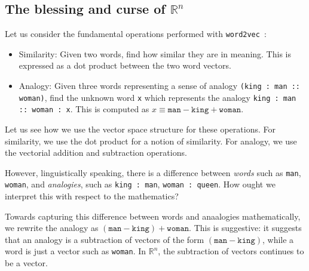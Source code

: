 \documentclass{book}
\newcommand{\wtov}{\texttt{word2vec }}
\begin{document}


\subsection{The blessing and curse of $\mathbb{R}^n$}

Let us consider the fundamental operations performed with \wtov:

\begin{itemize}
\item Similarity: Given two words, find how similar they are in meaning. This is
     expressed as a dot product between the two word vectors.
\item Analogy: Given three words representing a sense of analogy \texttt{(king : man :: woman)},
      find the unknown word \texttt{x} which represents the analogy
      \texttt{king : man :: woman : x}. This is computed as $x \equiv \texttt{man} - \texttt{king} + \texttt{woman}$.
\end{itemize}

Let us see how we use the vector space structure for these operations.
For similarity, we use the dot product for a notion of similarity. For 
analogy, we use the vectorial addition and subtraction operations.

However, linguistically speaking, there is a difference between \emph{words}
such as \texttt{man}, \texttt{woman}, and \emph{analogies}, such as
\texttt{king : man}, \texttt{woman : queen}. How ought we interpret this
with respect to the mathematics?

Towards capturing this difference between words and anaalogies mathematically,
we rewrite the analogy as $(\texttt{man} - \texttt{king}) + \texttt{woman}$.
This is suggestive: it suggests that an analogy is a subtraction of
vectors of the form $(\texttt{man}-\texttt{king})$, while a word is just a vector
such as \texttt{woman}.
In $\mathbb{R}^n$, the subtraction of vectors continues to  be a vector.
\end{document}
